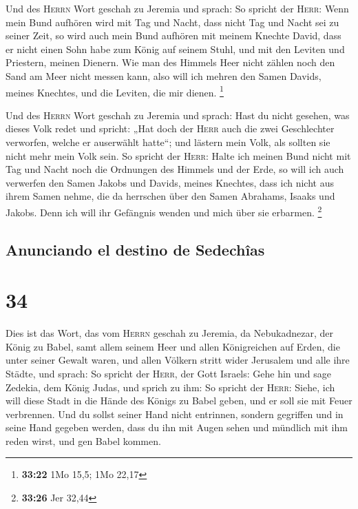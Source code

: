  Und des \textsc{Herrn} Wort geschah zu Jeremia und
sprach:  So spricht der \textsc{Herr}: Wenn mein Bund
aufhören wird mit Tag und Nacht, dass nicht Tag und Nacht sei zu seiner
Zeit,  so wird auch mein Bund aufhören mit meinem Knechte
David, dass er nicht einen Sohn habe zum König auf seinem Stuhl, und mit
den Leviten und Priestern, meinen Dienern.  Wie man des
Himmels Heer nicht zählen noch den Sand am Meer nicht messen kann, also
will ich mehren den Samen Davids, meines Knechtes, und die Leviten, die
mir dienen. \footnote{\textbf{33:22} 1Mo 15,5; 1Mo 22,17}

 Und des \textsc{Herrn} Wort geschah zu Jeremia und
sprach:  Hast du nicht gesehen, was dieses Volk redet und
spricht: „Hat doch der \textsc{Herr} auch die zwei Geschlechter
verworfen, welche er auserwählt hatte``; und lästern mein Volk, als
sollten sie nicht mehr mein Volk sein.  So spricht der
\textsc{Herr}: Halte ich meinen Bund nicht mit Tag und Nacht noch die
Ordnungen des Himmels und der Erde,  so will ich auch
verwerfen den Samen Jakobs und Davids, meines Knechtes, dass ich nicht
aus ihrem Samen nehme, die da herrschen über den Samen Abrahams, Isaaks
und Jakobs. Denn ich will ihr Gefängnis wenden und mich über sie
erbarmen. \footnote{\textbf{33:26} Jer 32,44}

\hypertarget{anunciando-el-destino-de-sedechuxeeas}{%
\subsection{Anunciando el destino de
Sedechîas}\label{anunciando-el-destino-de-sedechuxeeas}}

\hypertarget{section-33}{%
\section{34}\label{section-33}}

 Dies ist das Wort, das vom \textsc{Herrn} geschah zu
Jeremia, da Nebukadnezar, der König zu Babel, samt allem seinem Heer und
allen Königreichen auf Erden, die unter seiner Gewalt waren, und allen
Völkern stritt wider Jerusalem und alle ihre Städte, und sprach:
 So spricht der \textsc{Herr}, der Gott Israels: Gehe hin
und sage Zedekia, dem König Judas, und sprich zu ihm: So spricht der
\textsc{Herr}: Siehe, ich will diese Stadt in die Hände des Königs zu
Babel geben, und er soll sie mit Feuer verbrennen.  Und du
sollst seiner Hand nicht entrinnen, sondern gegriffen und in seine Hand
gegeben werden, dass du ihn mit Augen sehen und mündlich mit ihm reden
wirst, und gen Babel kommen.

